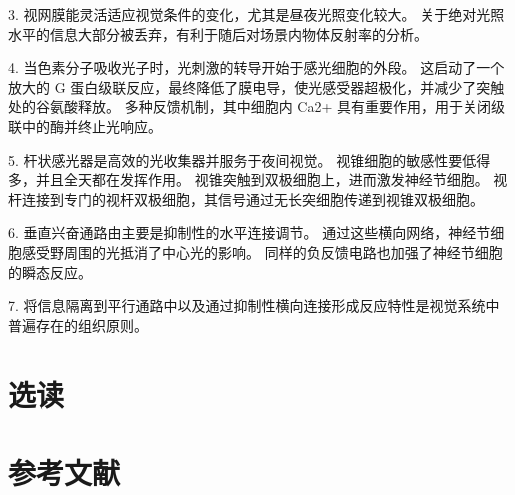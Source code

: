 3. 视网膜能灵活适应视觉条件的变化，尤其是昼夜光照变化较大。 关于绝对光照水平的信息大部分被丢弃，有利于随后对场景内物体反射率的分析。 

4. 当色素分子吸收光子时，光刺激的转导开始于感光细胞的外段。 这启动了一个放大的 G 蛋白级联反应，最终降低了膜电导，使光感受器超极化，并减少了突触处的谷氨酸释放。 多种反馈机制，其中细胞内 Ca2+ 具有重要作用，用于关闭级联中的酶并终止光响应。 

5. 杆状感光器是高效的光收集器并服务于夜间视觉。 视锥细胞的敏感性要低得多，并且全天都在发挥作用。 视锥突触到双极细胞上，进而激发神经节细胞。 视杆连接到专门的视杆双极细胞，其信号通过无长突细胞传递到视锥双极细胞。 

6. 垂直兴奋通路由主要是抑制性的水平连接调节。 通过这些横向网络，神经节细胞感受野周围的光抵消了中心光的影响。 同样的负反馈电路也加强了神经节细胞的瞬态反应。 

7. 将信息隔离到平行通路中以及通过抑制性横向连接形成反应特性是视觉系统中普遍存在的组织原则。


\section{选读}
\section{参考文献}